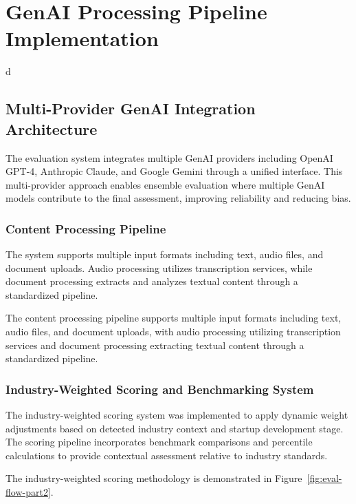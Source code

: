 \section{GenAI Processing Pipeline Implementation}d
\subsection{Multi-Provider GenAI Integration Architecture}
The evaluation system integrates multiple GenAI providers including OpenAI GPT-4, Anthropic Claude, and Google Gemini through a unified interface. This multi-provider approach enables ensemble evaluation where multiple GenAI models contribute to the final assessment, improving reliability and reducing bias.
\subsubsection{Content Processing Pipeline}
The system supports multiple input formats including text, audio files, and document uploads. Audio processing utilizes transcription services, while document processing extracts and analyzes textual content through a standardized pipeline.

The content processing pipeline supports multiple input formats including text, audio files, and document uploads, with audio processing utilizing transcription services and document processing extracting textual content through a standardized pipeline.

\subsubsection{Industry-Weighted Scoring and Benchmarking System}
The industry-weighted scoring system was implemented to apply dynamic weight adjustments based on detected industry context and startup development stage. The scoring pipeline incorporates benchmark comparisons and percentile calculations to provide contextual assessment relative to industry standards.

The industry-weighted scoring methodology is demonstrated in Figure~\ref{fig:eval-flow-part2}.


